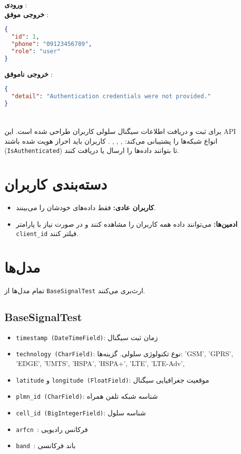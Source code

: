 \documentclass{report}
\begin{document}
\textbf{ورودی }:   \\

\textbf{خروجی موفق }:
\begin{lstlisting}[language=json]
{
  "id": 1,
  "phone": "09123456789",
  "role": "user"
}
\end{lstlisting}

\textbf{خروجی ناموفق }:
\begin{lstlisting}[language=json]
{
  "detail": "Authentication credentials were not provided."
}
\end{lstlisting}

\section{}
برای ثبت و دریافت اطلاعات سیگنال سلولی کاربران طراحی شده است. این API انواع شبکه‌ها را پشتیبانی می‌کند: , , , . کاربران باید احراز هویت شده باشند (\texttt{IsAuthenticated}) تا بتوانند داده‌ها را ارسال یا دریافت کنند.

\section{دسته‌بندی کاربران}
\begin{itemize}
    \item \textbf{کاربران عادی:} فقط داده‌های خودشان را می‌بینند.
    \item \textbf{ادمین‌ها:} می‌توانند داده همه کاربران را مشاهده کنند و در صورت نیاز با پارامتر \texttt{client\_id} فیلتر کنند.
\end{itemize}

\section{مدل‌ها}
تمام مدل‌ها از \texttt{BaseSignalTest} ارث‌بری می‌کنند.

\subsection{BaseSignalTest}
\begin{itemize}
    \item \texttt{timestamp (DateTimeField)}: زمان ثبت سیگنال
    \item \texttt{technology (CharField)}: نوع تکنولوژی سلولی. گزینه‌ها: 'GSM', 'GPRS', 'EDGE', 'UMTS', 'HSPA', 'HSPA+', 'LTE', 'LTE-Adv', 
    \item \texttt{latitude} و \texttt{longitude (FloatField)}: موقعیت جغرافیایی سیگنال
    \item \texttt{plmn\_id (CharField)}: شناسه شبکه تلفن همراه
    \item \texttt{cell\_id (BigIntegerField)}: شناسه سلول
    \item \texttt{arfcn }: فرکانس رادیویی
    \item \texttt{band }: باند فرکانسی
\end{itemize}
\end{document}
